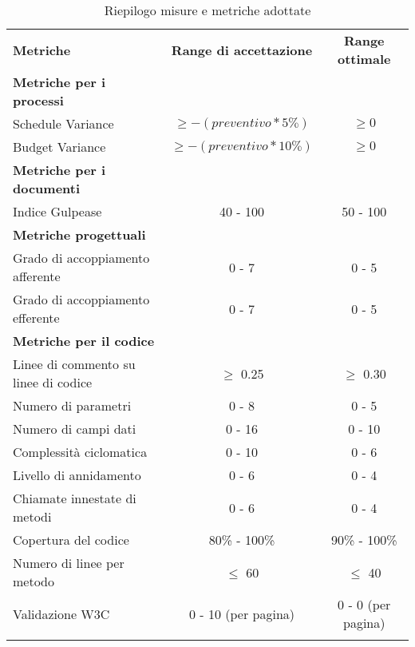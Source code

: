 \documentclass[../PianoDiQualifica.tex]{subfiles}
\begin{document}
				\begin{table}[H]
					\begin{tabular}{!{\VRule[1.4pt]}l!{\VRule}c!{\VRule}c!{\VRule[1.4pt]}}
						\textbf{Metriche} & \textbf{Range di accettazione} & \textbf{Range ottimale} \\
						\textbf{Metriche per i processi} & & \\ \hline
						Schedule Variance & $\geq -(preventivo*5\%)$ & $\geq 0$ \\ \hline
						Budget Variance & $\geq -(preventivo*10\%)$ & $\geq 0$ \\ \hline
						\textbf{Metriche per i documenti} & & \\ \hline
						Indice Gulpease & 40 - 100 & 50 - 100 \\
						\textbf{Metriche progettuali} &  &  \\ \hline
						Grado di accoppiamento afferente & 0 - 7 & 0 - 5 \\ \hline
						Grado di accoppiamento efferente & 0 - 7 & 0 - 5 \\ \hline
						\textbf{Metriche per il codice} &  &  \\ \hline
						Linee di commento su linee di codice & $\geq$ 0.25 & $\geq$ 0.30 \\ \hline
						Numero di parametri & 0 - 8 & 0 - 5  \\ \hline
						Numero di campi dati & 0 - 16 & 0 - 10 \\ \hline
						Complessità ciclomatica & 0 - 10 & 0 - 6  \\ \hline
						Livello di annidamento & 0 - 6 & 0 - 4 \\ \hline
						Chiamate innestate di metodi & 0 - 6 & 0 - 4 \\ \hline
						Copertura del codice & 80\% - 100\% & 90\% - 100\% \\ \hline
						Numero di linee per metodo & $\leq$ 60 & $\leq$ 40 \\ \hline
						Validazione W3C & 0 - 10 (per pagina) & 0 - 0 (per pagina) \\
					\end{tabular}
					\caption{Riepilogo misure e metriche adottate}
				\end{table}
\end{document}
